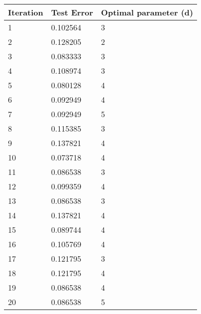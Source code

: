 \documentclass[
]{article}
\author{}
\date{}
\begin{document}
\begin{longtable}[]{@{}lll@{}}
\toprule
Iteration & Test Error & Optimal parameter (d)\tabularnewline
\midrule
\endhead
1 & 0.102564 & 3\tabularnewline
2 & 0.128205 & 2\tabularnewline
3 & 0.083333 & 3\tabularnewline
4 & 0.108974 & 3\tabularnewline
5 & 0.080128 & 4\tabularnewline
6 & 0.092949 & 4\tabularnewline
7 & 0.092949 & 5\tabularnewline
8 & 0.115385 & 3\tabularnewline
9 & 0.137821 & 4\tabularnewline
10 & 0.073718 & 4\tabularnewline
11 & 0.086538 & 3\tabularnewline
12 & 0.099359 & 4\tabularnewline
13 & 0.086538 & 3\tabularnewline
14 & 0.137821 & 4\tabularnewline
15 & 0.089744 & 4\tabularnewline
16 & 0.105769 & 4\tabularnewline
17 & 0.121795 & 3\tabularnewline
18 & 0.121795 & 4\tabularnewline
19 & 0.086538 & 4\tabularnewline
20 & 0.086538 & 5\tabularnewline
\bottomrule
\end{longtable}
\end{document}
